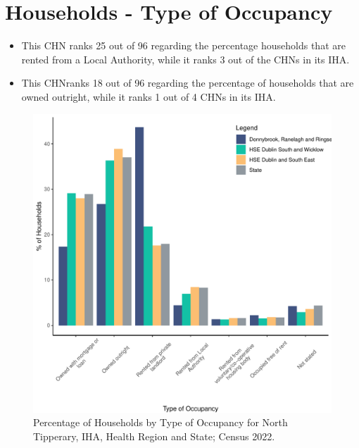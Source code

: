 \documentclass{article}
\begin{document}
\section{Households - Type of Occupancy}\label{sect:Households}
\begin{itemize}
\item This CHN ranks  25 out of 96 regarding the percentage households that are rented from a Local Authority, while it ranks  3 out of the CHNs in its IHA. 
\item This CHNranks  18 out of 96 regarding the percentage of households that are owned outright, while it ranks   1 out of 4 CHNs in its IHA.
\end{itemize}
\begin{figure}[H]
	\centering
	\includegraphics[width = 140mm]{../figures/HouseholdsED.pdf}
	\caption{Percentage of Households by Type of Occupancy for North Tipperary, IHA, Health Region and State; Census 2022.}
	\label{fig:vbnv}
	\end{figure}
\end{document}
